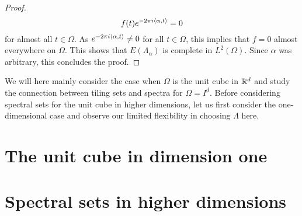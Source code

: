 \documentclass[../thesis.tex]{subfiles}
\begin{document}
\begin{proof}
    \begin{equation*}
        f(t) e^{-2 \pi i \langle\alpha, t\rangle} = 0
    \end{equation*}
    for almost all $t \in \Omega$. As $e^{-2 \pi i \langle\alpha, t\rangle} \neq 0$ for all $t\in \Omega$, this implies that $f = 0$ almost everywhere on $\Omega$. This shows that $E(\Lambda_\alpha)$ is complete in $L^2(\Omega)$. %
    Since $\alpha$ was arbitrary, this concludes the proof. 
\end{proof}

We will here mainly consider the case when $\Omega$ is the unit cube in $\mathbb{R}^d$ and study the connection between tiling sets and spectra for $\Omega=I^d$.  Before considering spectral sets for the unit cube in higher dimensions, let us first consider the one-dimensional case and observe our limited flexibility in choosing $\Lambda$ here.

\section{The unit cube in dimension one}\label{sec:complx_trig_1d}
    

\section{Spectral sets in higher dimensions}\label{sec:spec_higher_dim}
    
\end{document}

